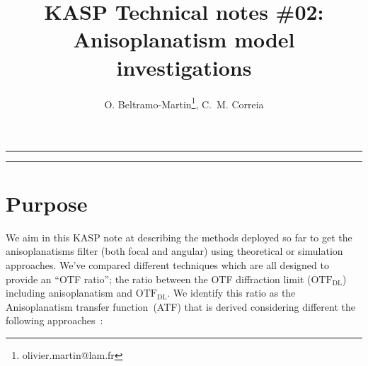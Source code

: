 \documentclass[12pt]{article}
\title{KASP Technical notes \#02:\\ Anisoplanatism model investigations}
\author{O. Beltramo-Martin\footnote{olivier.martin@lam.fr}, C.~M. Correia}
\date{}
\newcommand{\otfdl}{\text{OTF}_\text{DL}}
\begin{document}
\maketitle


\rule{\columnwidth}{0.1mm}
\tableofcontents
\rule{\columnwidth}{0.1mm}
\section{Purpose}

We aim in this KASP note at describing the methods deployed so far to get the anisoplanatisms filter (both focal and angular) using theoretical  or simulation approaches.  We've compared different techniques which are all designed to provide an “OTF ratio”; the ratio between the OTF diffraction limit ($\otfdl$) including anisoplanatism and $\otfdl$. We identify this ratio as the Anisoplanatism transfer function~(ATF) that is derived considering different the following approaches~:
\end{document}
